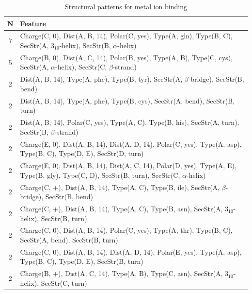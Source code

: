 \documentclass[11pt,twoside,a4paper]{book}
\begin{document}
\begin{table}\begin{tabularx}{\textwidth}{cX}\textbf{N} & \textbf{Feature} \\ \hline  
7 & Charge(C, 0), Dist(A, B, 14), Polar(C, yes),  Type(A, gln), Type(B, C), \newline SecStr(A, $3_{10}$-helix), SecStr(B, $\alpha$-helix)\\ \hline 
5 & Charge(B, 0), Dist(A, C, 14), Polar(B, yes),  Type(A, B), Type(C, cys), \newline SecStr(A, $\alpha$-helix), SecStr(C, $\beta$-strand)\\ \hline 
2 & Dist(A, B, 14),  Type(A, phe), Type(B, tyr), SecStr(A, $\beta$-bridge), SecStr(B, bend)\\ \hline 
2 & Dist(A, B, 14),  Type(A, phe), Type(B, cys), SecStr(A, bend), SecStr(B, turn)\\ \hline 
2 & Dist(A, B, 14), Polar(C, yes),  Type(A, C), Type(B, his), SecStr(A, turn), \newline SecStr(B, $\beta$-strand)\\ \hline 
2 & Charge(E, 0), Dist(A, B, 14), Dist(A, D, 14), Polar(C, yes),  Type(A, asp), \newline Type(B, C), Type(D, E), SecStr(D, turn)\\ \hline 
2 & Charge(E, 0), Dist(A, B, 14), Dist(A, C, 14), Polar(D, yes),  Type(A, E), \newline Type(B, gly), Type(C, D), SecStr(B, turn), SecStr(C, $\alpha$-helix)\\ \hline 
2 & Charge(C, +), Dist(A, B, 14),  Type(A, C), Type(B, ile), SecStr(A, $\beta$-bridge), \newline SecStr(B, bend)\\ \hline 
2 & Charge(C, +), Dist(A, B, 14),  Type(A, C), Type(B, asn), SecStr(A, $3_{10}$-helix), \newline SecStr(B, turn)\\ \hline 
2 & Charge(C, 0), Dist(A, B, 14), Polar(C, yes),  Type(A, thr), Type(B, C), \newline SecStr(A, bend), SecStr(B, turn)\\ \hline 
2 & Charge(C, 0), Dist(A, B, 14), Dist(A, D, 14), Polar(E, yes),  Type(A, asp), \newline Type(B, C), Type(D, E), SecStr(B, turn)\\ \hline 
2 & Charge(B, +), Dist(A, C, 14),  Type(A, B), Type(C, asn), SecStr(A, $3_{10}$-helix), \newline SecStr(C, turn)\\ \hline 
 \end{tabularx}\caption{Structural patterns for metal ion binding}\label{tab:metal_ion_binding}\end{table}
\end{document}
